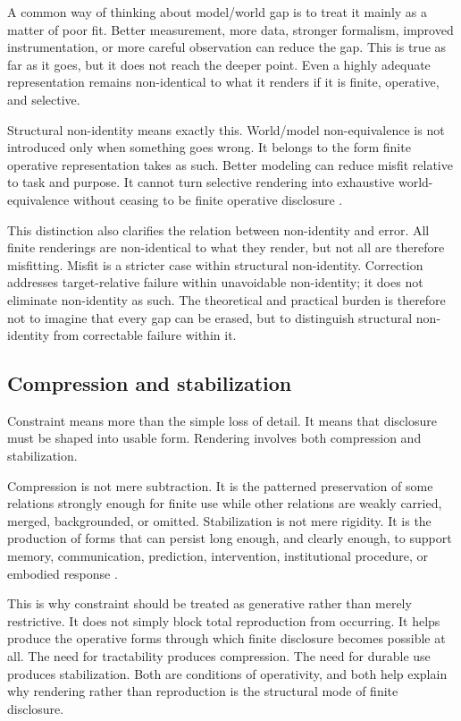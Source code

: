 \documentclass[11pt]{article}
\begin{document}
A common way of thinking about model/world gap is to treat it mainly as a matter of poor fit. Better measurement, more data, stronger formalism, improved instrumentation, or more careful observation can reduce the gap. This is true as far as it goes, but it does not reach the deeper point. Even a highly adequate representation remains non-identical to what it renders if it is finite, operative, and selective.

Structural non-identity means exactly this. World/model non-equivalence is not introduced only when something goes wrong. It belongs to the form finite operative representation takes as such. Better modeling can reduce misfit relative to task and purpose. It cannot turn selective rendering into exhaustive world-equivalence without ceasing to be finite operative disclosure \cite{FriggNguyen2021ScientificRepresentationSEP,ConantAshby1970GoodRegulator}.

This distinction also clarifies the relation between non-identity and error. All finite renderings are non-identical to what they render, but not all are therefore misfitting. Misfit is a stricter case within structural non-identity. Correction addresses target-relative failure within unavoidable non-identity; it does not eliminate non-identity as such. The theoretical and practical burden is therefore not to imagine that every gap can be erased, but to distinguish structural non-identity from correctable failure within it.

\subsection{Compression and stabilization}

Constraint means more than the simple loss of detail. It means that disclosure must be shaped into usable form. Rendering involves both compression and stabilization.

Compression is not mere subtraction. It is the patterned preservation of some relations strongly enough for finite use while other relations are weakly carried, merged, backgrounded, or omitted. Stabilization is not mere rigidity. It is the production of forms that can persist long enough, and clearly enough, to support memory, communication, prediction, intervention, institutional procedure, or embodied response \cite{Ashby1956IntroductionCybernetics,ConantAshby1970GoodRegulator}.

This is why constraint should be treated as generative rather than merely restrictive. It does not simply block total reproduction from occurring. It helps produce the operative forms through which finite disclosure becomes possible at all. The need for tractability produces compression. The need for durable use produces stabilization. Both are conditions of operativity, and both help explain why rendering rather than reproduction is the structural mode of finite disclosure.
\end{document}
